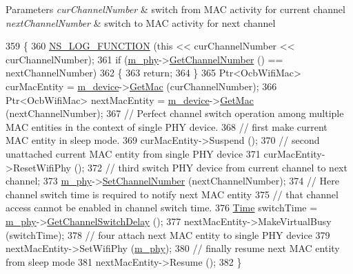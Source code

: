 \begin{DoxyParams}{Parameters}
{\em cur\+Channel\+Number} & switch from M\+AC activity for current channel \\
\hline
{\em next\+Channel\+Number} & switch to M\+AC activity for next channel \\
\hline
\end{DoxyParams}

\begin{DoxyCode}
359 \{
360   \hyperlink{log-macros-disabled_8h_a90b90d5bad1f39cb1b64923ea94c0761}{NS\_LOG\_FUNCTION} (\textcolor{keyword}{this} << curChannelNumber << curChannelNumber);
361   \textcolor{keywordflow}{if} (\hyperlink{classns3_1_1DefaultChannelScheduler_ae255b2ebc5808dec8d3c09bac8819d7b}{m\_phy}->\hyperlink{classns3_1_1WifiPhy_a5cf0ccf06109ace61db51c83e91b7e8d}{GetChannelNumber} () == nextChannelNumber)
362     \{
363       \textcolor{keywordflow}{return};
364     \}
365   Ptr<OcbWifiMac> curMacEntity = \hyperlink{classns3_1_1ChannelScheduler_ac3d6c3071b8c796afb73789844968405}{m\_device}->\hyperlink{classns3_1_1WaveNetDevice_a899f670dd8eb023f0e40f19b536724eb}{GetMac} (curChannelNumber);
366   Ptr<OcbWifiMac> nextMacEntity = \hyperlink{classns3_1_1ChannelScheduler_ac3d6c3071b8c796afb73789844968405}{m\_device}->\hyperlink{classns3_1_1WaveNetDevice_a899f670dd8eb023f0e40f19b536724eb}{GetMac} (nextChannelNumber);
367   \textcolor{comment}{// Perfect channel switch operation among multiple MAC entities in the context of single PHY device.}
368   \textcolor{comment}{// first make current MAC entity in sleep mode.}
369   curMacEntity->Suspend ();
370   \textcolor{comment}{// second unattached current MAC entity from single PHY device}
371   curMacEntity->ResetWifiPhy ();
372   \textcolor{comment}{// third switch PHY device from current channel to next channel;}
373   \hyperlink{classns3_1_1DefaultChannelScheduler_ae255b2ebc5808dec8d3c09bac8819d7b}{m\_phy}->\hyperlink{classns3_1_1WifiPhy_a2d13cf6ae4c185cae8516516afe4a32a}{SetChannelNumber} (nextChannelNumber);
374   \textcolor{comment}{// Here channel switch time is required to notify next MAC entity}
375   \textcolor{comment}{// that channel access cannot be enabled in channel switch time.}
376   \hyperlink{namespacens3_1_1TracedValueCallback_a7ffd3e7c142ffe7c8a1d2db9b8de38ec}{Time} switchTime = \hyperlink{classns3_1_1DefaultChannelScheduler_ae255b2ebc5808dec8d3c09bac8819d7b}{m\_phy}->\hyperlink{classns3_1_1WifiPhy_a87aceab44ed843359bdaab5ea8cf4ad3}{GetChannelSwitchDelay} ();
377   nextMacEntity->MakeVirtualBusy (switchTime);
378   \textcolor{comment}{// four attach next MAC entity to single PHY device}
379   nextMacEntity->SetWifiPhy (\hyperlink{classns3_1_1DefaultChannelScheduler_ae255b2ebc5808dec8d3c09bac8819d7b}{m\_phy});
380   \textcolor{comment}{// finally resume next MAC entity from sleep mode}
381   nextMacEntity->Resume ();
382 \}
\end{DoxyCode}


